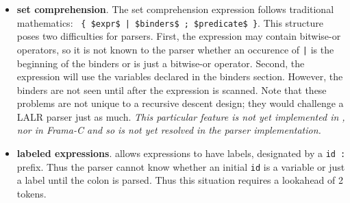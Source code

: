 \begin{itemize}
\item \textbf{set comprehension}. The set comprehension expression follows traditional mathematics: \lstinline: { $expr$ | $binders$ ; $predicate$ }:. This structure poses two difficulties for parsers. First, the expression may contain bitwise-or operators, so it is not known to the parser whether an occurence of \verb:|: is the beginning of the binders or is just a bitwise-or operator. Second, the expression will use the variables declared in the binders section. However, the binders are not seen until after the expression is scanned. Note that these problems are not unique to a recursive descent design; they would challenge a LALR parser just as much. \textit{This particular feature is not yet implemented in \fclang, nor in Frama-C and so is not yet resolved in the parser implementation.}
\item \textbf{labeled expressions}. \acslpp allows expressions to have labels, designated by a \lstinline|id : | prefix. Thus the parser cannot know whether an initial \lstinline|id| is a variable or just a label until the colon is parsed. Thus this situation requires a lookahead of 2 tokens.

\end{itemize}


